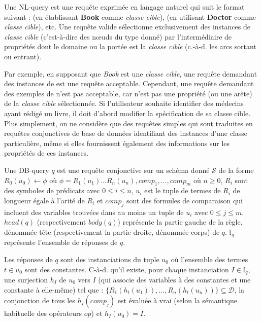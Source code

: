 \begin{definition}[NL-query]
    Une NL-query est une requête exprimée en langage naturel qui suit le format suivant :  (en établissant \textbf{Book} comme \emph{classe cible}),  (en utilisant \textbf{Doctor} comme \emph{classe cible}), etc.
    Une requête valide sélectionne exclusivement des instances de  \emph{classe cible} (c'est-à-dire des nœuds du type donné) par l'intermédiaire de propriétés dont le domaine ou la portée est la \emph{classe cible} (c.-à-d. les arcs sortant ou entrant).
\end{definition}

Par exemple, en supposant que \emph{Book} est une \emph{classe cible}, une requête demandant des instances de  est une requête acceptable.
Cependant, une requête demandant des exemples de  n'est pas acceptable, car  n'est pas une propriété (ou une arête) de la \emph{classe cible} sélectionnée.
Si l'utilisateur souhaite identifier des médecins ayant rédigé un livre, il doit d'abord modifier la spécification de sa classe cible.
Plus simplement, on ne considère que des requêtes simples qui sont traduites en requêtes conjonctives de base de données identifiant des instances d'une classe particulière, même si elles fournissent également des informations sur les propriétés de ces instances.

\begin{definition}[DB-query]
    Une DB-query $q$ est une requête conjonctive sur un schéma donné $\mathcal{S}$ de la forme $R_0(u_0) \leftarrow \phi$ où $\phi = R_1(u_1) \dots  R_n(u_n), comp_1, \dots, comp_m$ où $n \geq 0$, $R_i$ sont des symboles de prédicats avec $0 \leq i \leq n$, $u_i$ est le tuple de termes de $R_i$ de longueur égale à l'arité de $R_i$ et $comp_j$ sont des formules de comparaison qui incluent des variables trouvées dans au moins un tuple de $u_i$ avec $0 \leq j \leq m$.
    $head(q)$ (respectivement $body(q)$) représente la partie gauche de la règle, dénommée tête (respectivement la partie droite, dénommée corps) de $q$.
    $\mathbb{I}_q$ représente l'ensemble de réponses de $q$.

    Les réponses de $q$ sont des instanciations du tuple $u_0$ où l'ensemble des termes $t \in u_0$ sont des constantes.
    C-à-d. qu'il existe, pour chaque instanciation $I \in \mathbb{I}_q$, une surjection $h_I$ de $u_0$ vers $I$ (qui associe des variables à des constantes et une constante à elle-même) tel que : $\{R_1(h_t(u_1)), \dots, R_n(h_t(u_n))\} \subseteq \mathcal{D}$, la conjonction de tous les $h_I(comp_j)$ est évaluée à vrai (selon la sémantique habituelle des opérateurs $op$) et $h_I(u_0)= I$.

\end{definition}

